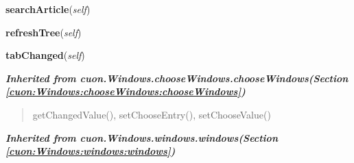     \vspace{0.5ex}

\hspace{.8\funcindent}\begin{boxedminipage}{\funcwidth}

    \raggedright \textbf{searchArticle}(\textit{self})

\setlength{\parskip}{2ex}
\setlength{\parskip}{1ex}
    \end{boxedminipage}

    \label{cuon:Garden:garden:gardenwindow:refreshTree}

    \vspace{0.5ex}

\hspace{.8\funcindent}\begin{boxedminipage}{\funcwidth}

    \raggedright \textbf{refreshTree}(\textit{self})

\setlength{\parskip}{2ex}
\setlength{\parskip}{1ex}
    \end{boxedminipage}

    \label{cuon:Garden:garden:gardenwindow:tabChanged}

    \vspace{0.5ex}

\hspace{.8\funcindent}\begin{boxedminipage}{\funcwidth}

    \raggedright \textbf{tabChanged}(\textit{self})

\setlength{\parskip}{2ex}
\setlength{\parskip}{1ex}
    \end{boxedminipage}


\large{\textbf{\textit{Inherited from cuon.Windows.chooseWindows.chooseWindows\textit{(Section \ref{cuon:Windows:chooseWindows:chooseWindows})}}}}

\begin{quote}
getChangedValue(), setChooseEntry(), setChooseValue()
\end{quote}

\large{\textbf{\textit{Inherited from cuon.Windows.windows.windows\textit{(Section \ref{cuon:Windows:windows:windows})}}}}

